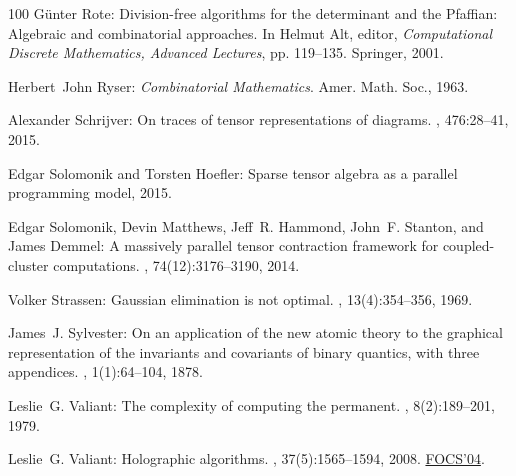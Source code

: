 \begin{thebibliography}{100}
{\sc G{\"{u}}nter Rote}: Division-free algorithms for the determinant and the
  {P}faffian: Algebraic and combinatorial approaches.
\newblock In {\sc Helmut Alt}, editor, {\em Computational Discrete Mathematics,
  Advanced Lectures}, pp. 119--135. Springer, 2001.
\newblock [\epfmtdoi{10.1007/3-540-45506-X\_9}]

{\sc Herbert~John Ryser}: {\em Combinatorial Mathematics}.
\newblock Amer. Math. Soc., 1963.

{\sc Alexander Schrijver}: On traces of tensor representations of diagrams.
, 476:28--41, 2015.

{\sc Edgar Solomonik and Torsten Hoefler}: Sparse tensor algebra as a parallel
  programming model, 2015.

{\sc Edgar Solomonik, Devin Matthews, Jeff~R. Hammond, John~F. Stanton, and
  James Demmel}: A massively parallel tensor contraction framework for
  coupled-cluster computations.
, 74(12):3176--3190, 2014.

{\sc Volker Strassen}: Gaussian elimination is not optimal.
, 13(4):354--356, 1969.
\newblock [\epfmtdoi{10.1007/BF02165411}]

{\sc James~J. Sylvester}: On an application of the new atomic theory to the
  graphical representation of the invariants and covariants of binary quantics,
  with three appendices.
, 1(1):64--104, 1878.
\newblock [\epfmtdoi{10.2307/2369436}]

{\sc Leslie~G. Valiant}: The complexity of computing the permanent.
, 8(2):189--201, 1979.
\newblock [\epfmtdoi{10.1016/0304-3975(79)90044-6}]

{\sc Leslie~G. Valiant}: Holographic algorithms.
, 37(5):1565--1594, 2008.
\newblock \prelim \href{https://doi.org/10.1109/FOCS.2004.34}{FOCS'04}.


\end{thebibliography}
